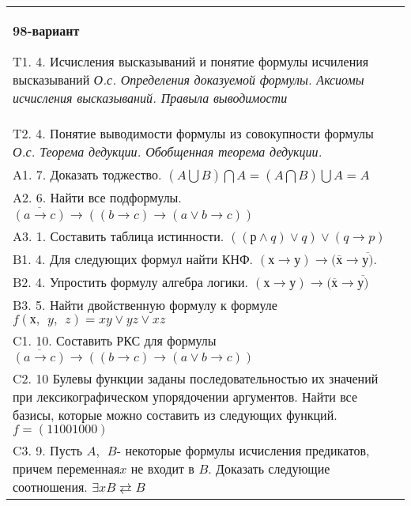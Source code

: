\documentclass{article}
\begin{document}
\begin{tabular}{m{17cm}}
\textbf{98-вариант}
\newline

T1. 4. Исчисления высказываний и понятие формулы исчиления высказываний \emph{О.с. Определения доказуемой формулы. Аксиомы исчисления высказываний. Правыла выводимости} \\
T2. 4. Понятие выводимости формулы из совокупности формулы \emph{О.с. Теорема дедукции. Обобщенная теорема дедукции.} \\
A1. 7. Доказать тоджество. \((A\bigcup B)\bigcap A = (A\bigcap B)\bigcup A = A\) \\
A2. 6. Найти все подформулы. \(\overline{(a \rightarrow c)} \rightarrow \left( (b \rightarrow c) \rightarrow (a \vee b \rightarrow c) \right)\) \\
A3. 1. Составить таблица истинности. \(\left( (р \land q) \vee q \right) \vee (q \rightarrow p)\) \\
B1. 4. Для следующих формул найти КНФ. \((х \rightarrow у) \rightarrow (\overline{х} \rightarrow \overline{у)}\). \\
B2. 4. Упростить формулу алгебра логики. \((х \rightarrow у) \rightarrow (\overline{х} \rightarrow \overline{у)}\) \\
B3. 5. Найти двойственную формулу к формуле \(f(х,\ \ y,\ \ z) = xy \vee yz \vee xz\) \\
C1. 10. Составить РКС для формулы \(\overline{(a \rightarrow c)} \rightarrow \left( (b \rightarrow c) \rightarrow (a \vee b \rightarrow c) \right)\) \\
C2. 10 Булевы функции заданы последовательностью их значений при лексикографическом упорядочении аргументов. Найти все базисы, которые можно составить из следующих функций. \(f = (11001000)\) \\
C3. 9. Пусть \(A,\ \ B\)- некоторые формулы исчисления предикатов, причем переменная\(x\) не входит в \(B\). Доказать следующие соотношения. \(\exists xB \rightleftarrows B\)
 \\

\end{tabular}
\vspace{1cm}
\end{document}
